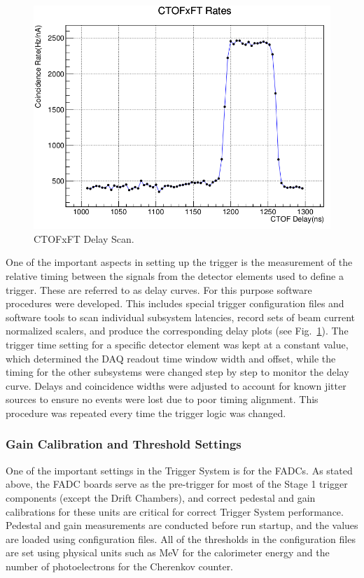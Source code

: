 \begin{figure}[hbt]
	\centering
	\includegraphics[width=1.0\columnwidth,keepaspectratio]{img/delay_scan_ctof_ft.png}
	\caption{CTOFxFT Delay Scan.}
	\label{fig:delay_scan_ctof_ft}
\end{figure}

One of the important aspects in setting up the trigger is the measurement of the relative timing between the signals from the detector elements used to define a trigger. These are referred to as delay curves. For this purpose software procedures were developed. This includes special trigger configuration files and software tools to scan individual subsystem latencies, record sets of beam current normalized scalers, and produce the corresponding delay plots (see Fig.~\ref{fig:delay_scan_ctof_ft}). The trigger time setting for a specific detector element was kept at a constant value, which determined the DAQ readout time window width and offset, while the timing for the other subsystems were changed step by step to monitor the delay curve. Delays and coincidence widths were adjusted to account for known jitter sources to ensure no events were lost due to poor timing alignment. This procedure was repeated every time the trigger logic was changed.


\subsubsection{Gain Calibration and Threshold Settings}

One of the important settings in the Trigger System is for the FADCs. As stated above, the FADC boards serve as the pre-trigger for most of the Stage 1 trigger components (except the Drift Chambers), and correct pedestal and gain calibrations for these units are critical for correct Trigger System performance. Pedestal and gain measurements are conducted before run startup, and the values are loaded using configuration files. All of the thresholds in the configuration files are set using physical units such as MeV for the calorimeter energy and the number of photoelectrons for the Cherenkov counter.


